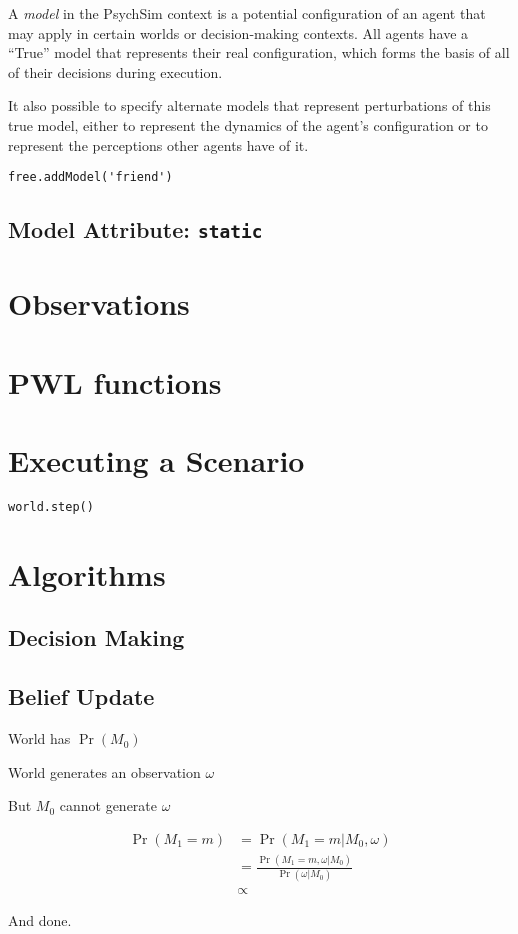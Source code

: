 \documentclass{article}
\begin{document}
A {\em model} in the PsychSim context is a potential configuration of an agent that may apply in certain worlds or decision-making contexts. All agents have a ``True'' model that represents their real configuration, which forms the basis of all of their decisions during execution. 


It also possible to specify alternate models that represent perturbations of this true model, either to represent the dynamics of the agent's configuration or to represent the perceptions other agents have of it.

\begin{verbatim}
free.addModel('friend')
\end{verbatim}

\subsection{Model Attribute: {\tt static}}

\section{Observations}

\section{PWL functions}\label{sec:pwl}

\section{Executing a Scenario}

\begin{verbatim}
world.step()
\end{verbatim}

\section{Algorithms}

\subsection{Decision Making}

\subsection{Belief Update}

World has $\Pr(M_0)$

World generates an observation $\omega$

But $M_0$ cannot generate $\omega$

\begin{align}
\Pr(M_1=m)&=\Pr(M_1=m|M_0,\omega)\\
&=\frac{\Pr(M_1=m,\omega|M_0)}{\Pr(\omega|M_0)}\\
&\propto 
\end{align}

And done.
\end{document}
